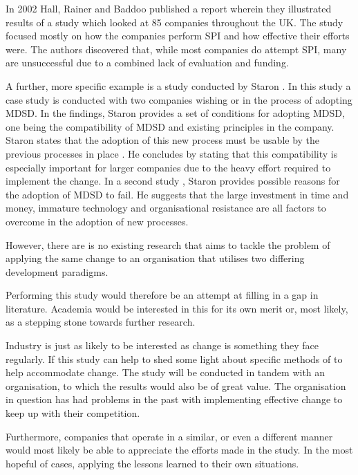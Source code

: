 \documentclass[times, 10pt,twocolumn]{Article}
\begin{document}
In 2002 Hall, Rainer and Baddoo \cite{hall2002implementing} published a report wherein they illustrated results of a study which looked at 85 companies throughout the UK. The study focused mostly on how the companies perform SPI and how effective their efforts were. The authors discovered that, while most companies do attempt SPI, many are unsuccessful due to a combined lack of evaluation and funding.

A further, more specific example is a study conducted by Staron \cite{staron2006adopting}. In this study a case study is conducted with two companies wishing or in the process of adopting MDSD. In the findings, Staron provides a set of conditions for adopting MDSD, one being the compatibility of MDSD and existing principles in the company. Staron states that the adoption of this new process must be usable by the previous processes in place \cite{staron2006adopting}. He concludes by stating that this compatibility is especially important for larger companies due to the heavy effort required to implement the change. In a second study \cite{staron2008transitioning}, Staron provides possible reasons for the adoption of MDSD to fail. He suggests that the large investment in time and money, immature technology and organisational resistance are all factors to overcome in the adoption of new processes.

However, there are is no existing research that aims to tackle the problem of applying the same change to an organisation that utilises two differing development paradigms.

Performing this study would therefore be an attempt at filling in a gap in literature. Academia would be interested in this for its own merit or, most likely, as a stepping stone towards further research.

Industry is just as likely to be interested as change is something they face regularly. If this study can help to shed some light about specific methods of to help accommodate change. The study will be conducted in tandem with an organisation, to which the results would also be of great value. The organisation in question has had problems in the past with implementing effective change to keep up with their competition. 

Furthermore, companies that operate in a similar, or even a different manner would most likely be able to appreciate the efforts made in the study. In the most hopeful of cases, applying the lessons learned to their own situations.
\end{document}
